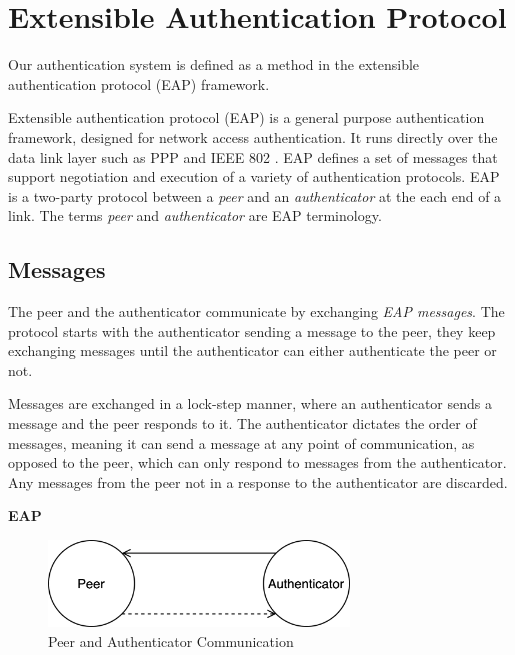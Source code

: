 \section{Extensible Authentication Protocol}
\label{section:eap}
Our authentication system is defined as a method in the extensible authentication protocol (EAP) framework.


Extensible authentication protocol \cite{aboba2004extensible} (EAP) is a general purpose authentication framework, designed for network access authentication. 
It runs directly over the data link layer such as PPP  \cite{simpson1994rfc1661} and IEEE 802 \cite{10.5555/18422.18423}.
EAP defines a set of messages that support negotiation and execution of a variety of authentication protocols.
EAP is a two-party protocol between a \textit{peer} and an \textit{authenticator} at the each end of a link. The terms \textit{peer} and \textit{authenticator} are EAP terminology.

\subsection{Messages}
The peer and the authenticator communicate by exchanging \textit{EAP messages}.
The protocol starts with the authenticator sending a message to the peer, they keep exchanging messages until the authenticator can either authenticate the peer or not.

Messages are exchanged in a lock-step manner, where an authenticator sends a message and the peer responds to it. 
The authenticator dictates the order of messages, meaning it can send a message at any point of communication, as opposed to the peer, which can only respond to messages from the authenticator.
Any messages from the peer not in a response to the authenticator are discarded.
\bigskip
\begin{center}
	\textbf{EAP}
\end{center}
\begin{figure}[h]
	\centering
	\includegraphics[width=8cm]{images/eap-messages}
	\caption{Peer and Authenticator Communication}
	\label{fig:eap-messages}
\end{figure}

